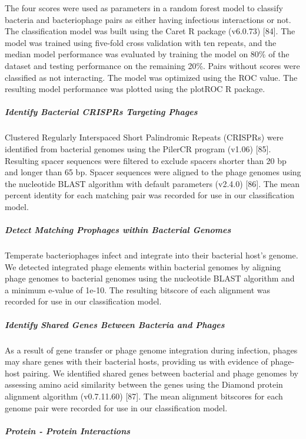 \documentclass[12pt,]{article}
\let\oldsubparagraph\subparagraph
\renewcommand{\subparagraph}[1]{\oldsubparagraph{#1}\mbox{}}
\begin{document}
The four scores were used as parameters in a random forest model to
classify bacteria and bacteriophage pairs as either having infectious
interactions or not. The classification model was built using the Caret
R package (v6.0.73) {[}84{]}. The model was trained using five-fold
cross validation with ten repeats, and the median model performance was
evaluated by training the model on 80\% of the dataset and testing
performance on the remaining 20\%. Pairs without scores were classified
as not interacting. The model was optimized using the ROC value. The
resulting model performance was plotted using the plotROC R package.

\subparagraph{Identify Bacterial CRISPRs Targeting
Phages}\label{identify-bacterial-crisprs-targeting-phages}

Clustered Regularly Interspaced Short Palindromic Repeats (CRISPRs) were
identified from bacterial genomes using the PilerCR program (v1.06)
{[}85{]}. Resulting spacer sequences were filtered to exclude spacers
shorter than 20 bp and longer than 65 bp. Spacer sequences were aligned
to the phage genomes using the nucleotide BLAST algorithm with default
parameters (v2.4.0) {[}86{]}. The mean percent identity for each
matching pair was recorded for use in our classification model.

\subparagraph{Detect Matching Prophages within Bacterial
Genomes}\label{detect-matching-prophages-within-bacterial-genomes}

Temperate bacteriophages infect and integrate into their bacterial
host's genome. We detected integrated phage elements within bacterial
genomes by aligning phage genomes to bacterial genomes using the
nucleotide BLAST algorithm and a minimum e-value of 1e-10. The resulting
bitscore of each alignment was recorded for use in our classification
model.

\subparagraph{Identify Shared Genes Between Bacteria and
Phages}\label{identify-shared-genes-between-bacteria-and-phages}

As a result of gene transfer or phage genome integration during
infection, phages may share genes with their bacterial hosts, providing
us with evidence of phage-host pairing. We identified shared genes
between bacterial and phage genomes by assessing amino acid similarity
between the genes using the Diamond protein alignment algorithm
(v0.7.11.60) {[}87{]}. The mean alignment bitscores for each genome pair
were recorded for use in our classification model.

\subparagraph{Protein - Protein
Interactions}\label{protein---protein-interactions}
\end{document}
